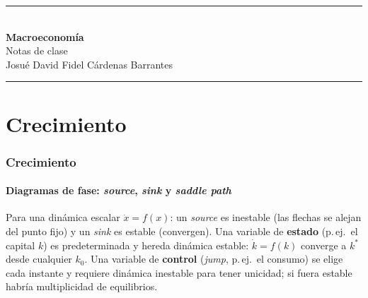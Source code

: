 \documentclass[11pt]{article}
\theoremstyle{definition}
\begin{document}
\begin{titlepage}
\thispagestyle{empty}
\vspace*{3.5cm}
\begin{center}
\rule{\textwidth}{1pt}\\[1.1cm]
{\Huge\bfseries Macroeconomía}\\[0.6cm]
{\Large Notas de clase}\\[0.35cm]
{\large Josué David Fidel Cárdenas Barrantes}\\[1.0cm]
\rule{\textwidth}{1pt}
\end{center}
\vfill
\end{titlepage}

\newpage
\tableofcontents
\thispagestyle{empty}
\newpage
\setcounter{page}{1}

\part{Crecimiento}

\section{Crecimiento}

\subsection{Diagramas de fase: \emph{source}, \emph{sink} y \emph{saddle path}}

Para una dinámica escalar $\dot{x}=f(x)$: un \emph{source} es inestable (las flechas se alejan del
punto fijo) y un \emph{sink} es estable (convergen). Una variable de \textbf{estado} (p.\,ej.\ el
capital $k$) es predeterminada y hereda dinámica estable: $\dot{k}=f(k)$ converge a $k^{\ast}$ desde
cualquier $k_{0}$. Una variable de \textbf{control} (\emph{jump}, p.\,ej.\ el consumo) se elige cada
instante y requiere dinámica inestable para tener unicidad; si fuera estable habría multiplicidad de
equilibrios.
\end{document}

